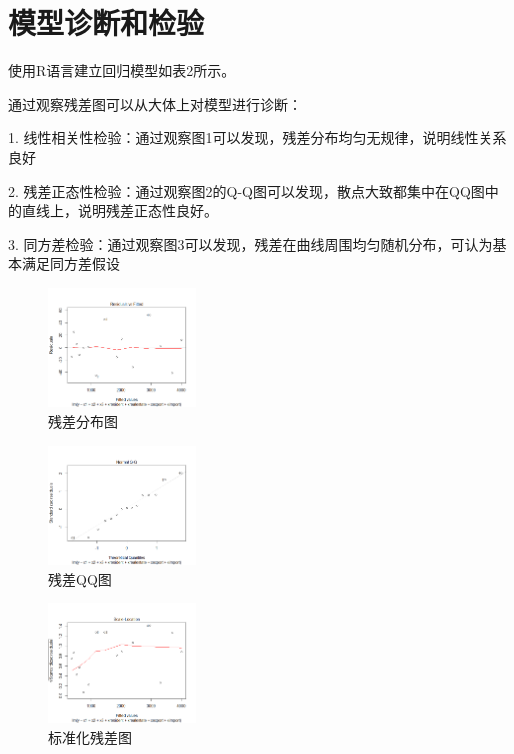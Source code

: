 \documentclass [a4paper]{article}
\begin{document}
\section{模型诊断和检验}

使用R语言建立回归模型如表2所示。

通过观察残差图可以从大体上对模型进行诊断：

1. 线性相关性检验：通过观察图1可以发现，残差分布均匀无规律，说明线性关系良好

2. 残差正态性检验：通过观察图2的Q-Q图可以发现，散点大致都集中在QQ图中的直线上，说明残差正态性良好。

3. 同方差检验：通过观察图3可以发现，残差在曲线周围均匀随机分布，可认为基本满足同方差假设

\begin{figure}[htbp]
  \centering
  \includegraphics[width=0.35\textwidth]{img/Rplot.png}
  \caption{残差分布图}\label{fig:digit}
\end{figure}

\begin{figure}[htbp]
  \centering
  \includegraphics[width=0.35\textwidth]{img/Rplot02.png}
  \caption{残差QQ图}\label{fig:digit}
\end{figure}

\begin{figure}[htbp]
  \centering
  \includegraphics[width=0.35\textwidth]{img/Rplot03.png}
  \caption{标准化残差图}\label{fig:digit}
\end{figure}
\end{document}
